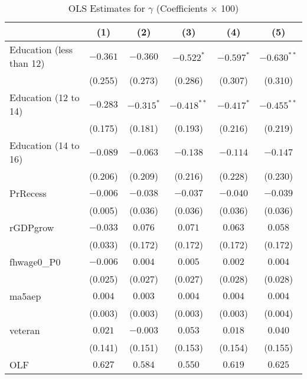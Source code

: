 \documentclass[12pt]{article}
\begin{document}
\begin{table}[H]
\centering
\caption{OLS Estimates for $\gamma$ (Coefficients $\times$ 100)}

\begin{tabular}{lccccc}

\toprule
                    & (1)     & (2)   & (3)    & (4)      & (5)         \\
\midrule
Education (less than 12)                & $-0.361$  & $-0.360$    & $-0.522^{*}$  & $-0.597^{*}$   & $-0.630^{**}$    \\
                    & (0.255)   & (0.273)     & (0.286)   & (0.307)    & (0.310)     \\
Education (12 to 14)                & $-0.283$  & $-0.315^{*}$    & $-0.418^{**}$  & $-0.417^{*}$   & $-0.455^{**}$    \\
                    & (0.175)   & (0.181)     & (0.193)   & (0.216)    & (0.219)     \\
Education (14 to 16)                & $-0.089$  & $-0.063$    & $-0.138$  & $-0.114$   & $-0.147$    \\
                    & (0.206)   & (0.209)     & (0.216)   & (0.228)    & (0.230)     \\
PrRecess            & $-0.006$   & $-0.038$     & $-0.037$   & $-0.040$    & $-0.039$     \\
                    & (0.005)   & (0.036)     & (0.036)   & (0.036)    & (0.036)     \\
rGDPgrow            & $-0.033$   & $0.076$     & $0.071$   & $0.063$    & $0.058$     \\
                    & (0.033)   & (0.172)     & (0.172)   & (0.172)    & (0.172)     \\
fhwage0\_P0         & $-0.006$   & $0.004$     & $0.005$   & $0.002$    & $0.004$     \\
                    & (0.025)   & (0.027)     & (0.027)   & (0.028)    & (0.028)     \\
ma5aep              & $0.004$   & $0.003$     & $0.004$   & $0.004$    & $0.004$     \\
                    & (0.003)   & (0.003)     & (0.003)   & (0.003)    & (0.004)     \\
veteran             & $0.021$   & $-0.003$     & $0.053$   & $0.018$    & $0.040$     \\
                    & (0.141)   & (0.151)     & (0.153)   & (0.154)    & (0.155)     \\
OLF                 & $0.627$   & $0.584$     & $0.550$   & $0.619$    & $0.625$     \\

\end{tabular}
\end{table}
\end{document}
